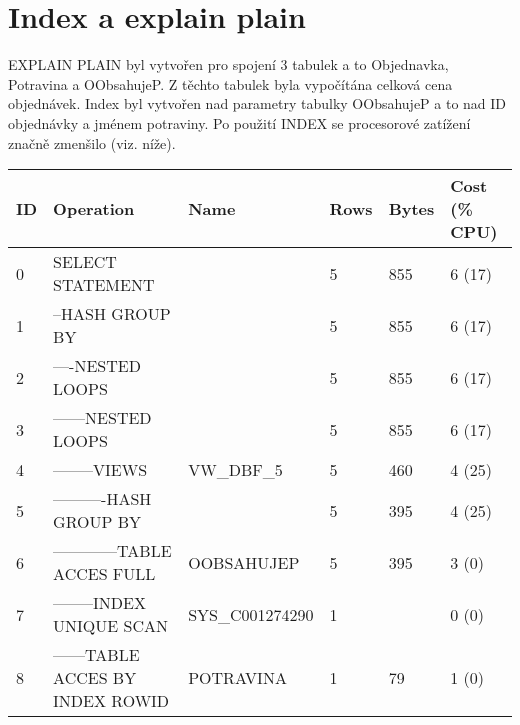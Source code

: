\documentclass[11pt, a4paper]{article}[]
\begin{document}
    \section{Index a explain plain}
    EXPLAIN PLAIN byl vytvořen pro spojení 3 tabulek a to Objednavka, Potravina
    a OObsahujeP. Z těchto tabulek byla vypočítána celková cena objednávek.
    Index byl vytvořen nad parametry tabulky OObsahujeP a to nad ID objednávky
    a jménem potraviny. Po použití INDEX se procesorové zatížení značně zmenšilo
    (viz. níže).
    \caption{Před použitím INDEX}
    \begin{table}[]
	\centering
	\begin{tabular}{|l|l|l|l|l|l|}
        \hline
        ID & Operation                        & Name            & Rows & Bytes & Cost (\% CPU) \\ \hline
        0  & SELECT STATEMENT                 &                 & 5    & 855   & 6 (17)        \\
        1  & --HASH GROUP BY                  &                 & 5    & 855   & 6 (17)        \\
        2  & ----NESTED LOOPS                 &                 & 5    & 855   & 6 (17)        \\
        3  & ------NESTED LOOPS               &                 & 5    & 855   & 6 (17)        \\
        4  & --------VIEWS                    & VW\_DBF\_5      & 5    & 460   & 4 (25)        \\
        5  & ----------HASH GROUP BY          &                 & 5    & 395   & 4 (25)        \\
        6  & ------------TABLE ACCES FULL     & OOBSAHUJEP      & 5    & 395   & 3 (0)         \\
        7  & --------INDEX UNIQUE SCAN        & SYS\_C001274290 & 1    &       & 0 (0)         \\
        8  & ------TABLE ACCES BY INDEX ROWID & POTRAVINA       & 1    & 79    & 1 (0)         \\ \hline
        \end{tabular}
        \end{table}    
    \caption{Po pouziti INDEX}
\end{document}
